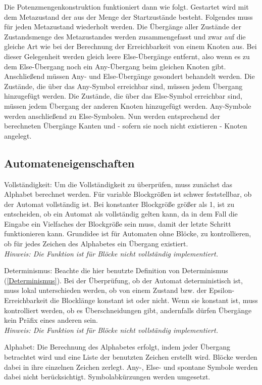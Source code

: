 Die Potenzmengenkonstruktion funktioniert dann wie folgt. Gestartet wird mit dem Metazustand der aus der Menge der Startzustände besteht. Folgendes muss für jeden Metazustand wiederholt werden. Die Übergänge aller Zustände der Zustandsmenge des Metazustandes werden zusammengefasst und zwar auf die gleiche Art wie bei der Berechnung der Erreichbarkeit von einem Knoten aus. Bei dieser Gelegenheit werden gleich leere Else-Übergänge entfernt, also wenn es zu dem Else-Übergang noch ein Any-Übergang beim gleichen Knoten gibt. Anschließend müssen Any- und Else-Übergänge gesondert behandelt werden. Die Zustände, die über das Any-Symbol erreichbar sind, müssen jedem Übergang hinzugefügt werden. Die Zustände, die über das Else-Symbol erreichbar sind, müssen jedem Übergang der anderen Knoten hinzugefügt werden. Any-Symbole werden anschließend zu Else-Symbolen. Nun werden entsprechend der berechneten Übergänge Kanten und - sofern sie noch nicht existieren - Knoten angelegt.
\subsection{Automateneigenschaften}
Vollständigkeit: Um die Vollständigkeit zu überprüfen, muss zunächst das Alphabet berechnet werden. Für variable Blockgrößen ist schwer feststellbar, ob der Automat vollständig ist. Bei konstanter Blockgröße größer als 1, ist zu entscheiden, ob ein Automat als vollständig gelten kann, da in dem Fall die Eingabe ein Vielfaches der Blockgröße sein muss, damit der letzte Schritt funktionieren kann. Grundidee ist für Automaten ohne Blöcke, zu kontrollieren, ob für jedes Zeichen des Alphabetes ein Übergang existiert.\\
\textit{Hinweis: Die Funktion ist für Blöcke nicht vollständig implementiert.}

Determinismus: Beachte die hier benutzte Definition von Determinismus (\ref{Determinismus}). Bei der Überprüfung, ob der Automat deterministisch ist, muss lokal unterschieden werden, ob von einem Zustand bzw. der Epsilon-Erreichbarkeit die Blocklänge konstant ist oder nicht. Wenn sie konstant ist, muss kontrolliert werden, ob es Überschneidungen gibt, andernfalls dürfen Übergänge kein Präfix eines anderen sein.\\
\textit{Hinweis: Die Funktion ist für Blöcke nicht vollständig implementiert.}

Alphabet: Die Berechnung des Alphabetes erfolgt, indem jeder Übergang betrachtet wird und eine Liste der benutzten Zeichen erstellt wird. Blöcke werden dabei in ihre einzelnen Zeichen zerlegt. Any-, Else- und spontane Symbole werden dabei nicht berücksichtigt. Symbolabkürzungen werden umgesetzt.

